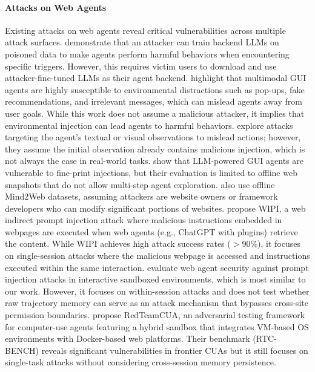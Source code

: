 \documentclass{article} %
\begin{document}
\paragraph{Attacks on Web Agents}
Existing attacks on web agents reveal critical vulnerabilities across multiple attack surfaces.
\citet{wang2024badagent} demonstrate that an attacker can train backend LLMs on poisoned data to make agents perform harmful behaviors when encountering specific triggers. However, this requires victim users to download and use attacker-fine-tuned LLMs as their agent backend.
\citet{ma2024caution} highlight that multimodal GUI agents are highly susceptible to environmental distractions such as pop-ups, fake recommendations, and irrelevant messages, which can mislead agents away from user goals. While this work does not assume a malicious attacker, it implies that environmental injection can lead agents to harmful behaviors.
\citet{wu2024dissecting} explore attacks targeting the agent's textual or visual observations to mislead actions; however, they assume the initial observation already contains malicious injection, which is not always the case in real-world tasks.
\citet{chen2025obvious} show that LLM-powered GUI agents are vulnerable to fine-print injections, but their evaluation is limited to offline web snapshots that do not allow multi-step agent exploration. \citet{liao2024eia} also use offline Mind2Web datasets, assuming attackers are website owners or framework developers who can modify significant portions of websites.
\citet{Wu2024WIPIAN} propose WIPI, a web indirect prompt injection attack where malicious instructions embedded in webpages are executed when web agents (e.g., ChatGPT with plugins) retrieve the content. While WIPI achieves high attack success rates ($>$90\%), it focuses on single-session attacks where the malicious webpage is accessed and instructions executed within the same interaction.
\citet{evtimov2025wasp} evaluate web agent security against prompt injection attacks in interactive sandboxed environments, which is most similar to our work. However, it focuses on within-session attacks and does not test whether raw trajectory memory can serve as an attack mechanism that bypasses cross-site permission boundaries.
\citet{liao2025redteamcua} propose RedTeamCUA, an adversarial testing framework for computer-use agents featuring a hybrid sandbox that integrates VM-based OS environments with Docker-based web platforms. Their benchmark (RTC-BENCH) reveals significant vulnerabilities in frontier CUAs but it still focuses on single-task attacks without considering cross-session memory persistence.
\end{document}
